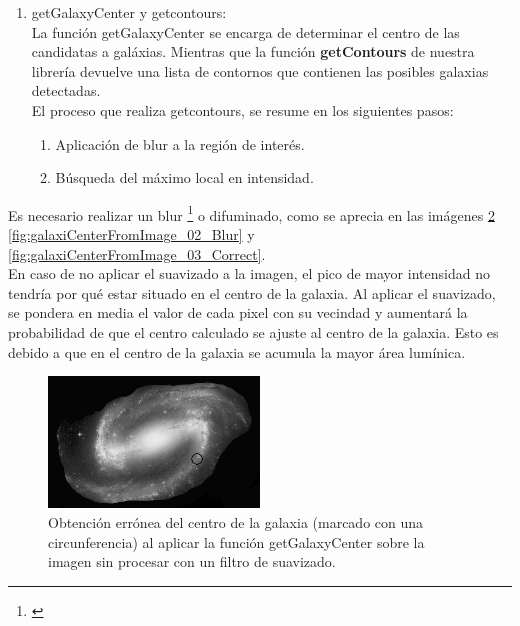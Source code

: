 \begin{enumerate}
\begin{enumerate}
\begin{figure}[!htb]
			\caption{\label{fig:removePointsConparation}{\small Resultado del proceso de categorización y eliminación de puntos de interés erróneos.}}
		\end{figure}

		
		\item Para cada grupo de blobs nos devuelve tanto su centro como su área.
	\end{enumerate}
	\item getGalaxyCenter y getcontours:	\\
	La función {\scriptsize getGalaxyCenter} se encarga de determinar el centro de las candidatas a galáxias. Mientras que la función \textbf {getContours} de nuestra librería devuelve una lista de contornos que contienen las posibles galaxias detectadas.\\
	El proceso que realiza {\scriptsize getcontours}, se resume en los siguientes pasos:
	\begin{enumerate}
		\item Aplicación de blur a la región de interés.
		\item Búsqueda del máximo local en intensidad.
	\end{enumerate}
	\end{enumerate}
	Es necesario realizar un blur \footnote{\cite{OpenCV}} o difuminado, como se aprecia en las imágenes \ref{fig:galaxiCenterFromImage_01_ERROR} \ref{fig:galaxiCenterFromImage_02_Blur} y \ref{fig:galaxiCenterFromImage_03_Correct}.\\
	En caso de no aplicar el suavizado a la imagen, el pico de mayor intensidad no tendría por qué estar situado en el centro de la galaxia. Al aplicar el suavizado, se pondera en media el valor de cada pixel con su vecindad y aumentará la probabilidad de que el centro calculado se ajuste al centro de la galaxia. Esto es debido a que en el centro de la galaxia se acumula la mayor área lumínica.
	\begin{figure}[!htb]
		\centering
		\includegraphics[width=0.5\textwidth]{images/galaxiCenterFromImage_01_ERROR.png}
		\caption{\label{fig:galaxiCenterFromImage_01_ERROR}{\small Obtención errónea del centro de la galaxia (marcado con una circunferencia) al aplicar la función {\scriptsize getGalaxyCenter} sobre la imagen sin procesar con un filtro de suavizado.}}
	\end{figure}
